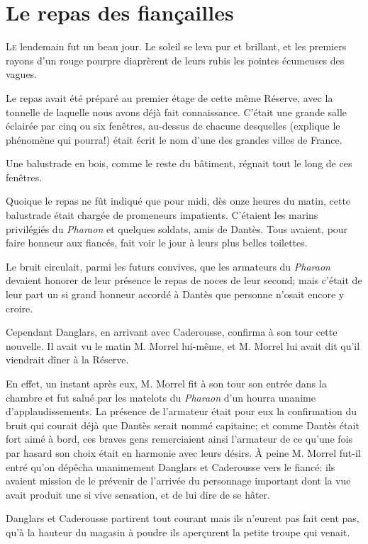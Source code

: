 \chapter{Le repas des fiançailles}

\lettrine{L}{e} lendemain fut un beau jour. Le soleil se leva pur et brillant, et les premiers rayons d'un rouge pourpre diaprèrent de leurs rubis les pointes écumeuses des vagues.

\zz
Le repas avait été préparé au premier étage de cette même Réserve, avec la tonnelle de laquelle nous avons déjà fait connaissance. C'était une grande salle éclairée par cinq ou six fenêtres, au-dessus de chacune desquelles (explique le phénomène qui pourra!) était écrit le nom d'une des grandes villes de France.

Une balustrade en bois, comme le reste du bâtiment, régnait tout le long de ces fenêtres.

Quoique le repas ne fût indiqué que pour midi, dès onze heures du matin, cette balustrade était chargée de promeneurs impatients. C'étaient les marins privilégiés du \textit{Pharaon} et quelques soldats, amis de Dantès. Tous avaient, pour faire honneur aux fiancés, fait voir le jour à leurs plus belles toilettes.

Le bruit circulait, parmi les futurs convives, que les armateurs du \textit{Pharaon} devaient honorer de leur présence le repas de noces de leur second; mais c'était de leur part un si grand honneur accordé à Dantès que personne n'osait encore y croire.

Cependant Danglars, en arrivant avec Caderousse, confirma à son tour cette nouvelle. Il avait vu le matin M. Morrel lui-même, et M. Morrel lui avait dit qu'il viendrait dîner à la Réserve.

En effet, un instant après eux, M. Morrel fit à son tour son entrée dans la chambre et fut salué par les matelots du \textit{Pharaon} d'un hourra unanime d'applaudissements. La présence de l'armateur était pour eux la confirmation du bruit qui courait déjà que Dantès serait nommé capitaine; et comme Dantès était fort aimé à bord, ces braves gens remerciaient ainsi l'armateur de ce qu'une fois par hasard son choix était en harmonie avec leurs désirs. À peine M. Morrel fut-il entré qu'on dépêcha unanimement Danglars et Caderousse vers le fiancé: ils avaient mission de le prévenir de l'arrivée du personnage important dont la vue avait produit une si vive sensation, et de lui dire de se hâter.

Danglars et Caderousse partirent tout courant mais ils n'eurent pas fait cent pas, qu'à la hauteur du magasin à poudre ils aperçurent la petite troupe qui venait.

